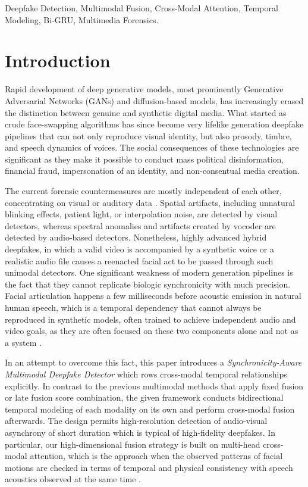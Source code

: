\documentclass[conference]{IEEEtran}
\begin{document}
\begin{IEEEkeywords}
Deepfake Detection, Multimodal Fusion, Cross-Modal Attention, Temporal Modeling, Bi-GRU, Multimedia Forensics.
\end{IEEEkeywords}

\section{Introduction}
\IEEEPARstart
 Rapid development of deep generative models, most prominently Generative Adversarial Networks (GANs) and diffusion-based models, has increasingly erased the distinction between genuine and synthetic digital media. What started as crude face-swapping algorithms has since become very lifelike generation deepfake pipelines that can not only reproduce visual identity, but also prosody, timbre, and speech dynamics of voices. The social consequences of these technologies are significant as they make it possible to conduct mass political disinformation, financial fraud, impersonation of an identity, and non-consentual media creation.

The current forensic countermeasures are mostly independent of each other, concentrating on visual or auditory data \cite{Dolhansky2022Generalization,Yang2023}. Spatial artifacts, including unnatural blinking effects, patient light, or interpolation noise, are detected by visual detectors, whereas spectral anomalies and artifacts created by vocoder are detected by audio-based detectors. Nonetheless, highly advanced hybrid deepfakes, in which a valid video is accompanied by a synthetic voice or a realistic audio file causes a reenacted facial act to be passed through such unimodal detectors. One significant weakness of modern generation pipelines is the fact that they cannot replicate biologic synchronicity with much precision. Facial articulation happens a few milliseconds before acoustic emission in natural human speech, which is a temporal dependency that cannot always be reproduced in synthetic models, often trained to achieve independent audio and video goals, as they are often focused on these two components alone and not as a system \cite{Haliassos2022}.

In an attempt to overcome this fact, this paper introduces a \textit{Synchronicity-Aware Multimodal Deepfake Detector} which rows cross-modal temporal relationships explicitly. In contrast to the previous multimodal methods that apply fixed fusion or late fusion score combination, the given framework conducts bidirectional temporal modeling of each modality on its own and perform cross-modal fusion afterwards. The design permits high-resolution detection of audio-visual asynchrony of short duration which is typical of high-fidelity deepfakes. In particular, our high-dimensional fusion strategy is built on multi-head cross-modal attention, which is the approach when the observed patterns of facial motions are checked in terms of temporal and physical consistency with speech acoustics observed at the same time \cite{Li2022Attention,Katamneni2024}.
\end{document}
